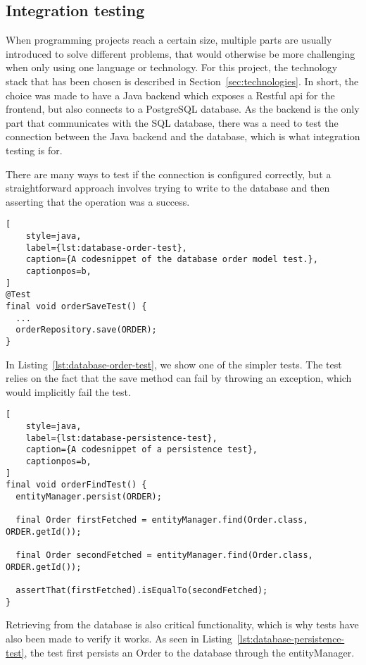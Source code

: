 \subsection{Integration testing}\label{subsec:integration-tests}

When programming projects reach a certain size, multiple parts are usually introduced to solve different problems,
that would otherwise be more challenging when only using one language or technology.
For this project, the technology stack that has been chosen is described in Section~\ref{sec:technologies}.
In short, the choice was made to have a Java backend which exposes a Restful api for the frontend, but also connects to
a PostgreSQL database.
As the backend is the only part that communicates with the SQL database, there was a need to test the connection between
the Java backend and the database, which is what integration testing is for.

There are many ways to test if the connection is configured correctly, but a straightforward approach involves trying
to write to the database and then asserting that the operation was a success.

\begin{lstlisting}[
    style=java,
    label={lst:database-order-test},
    caption={A codesnippet of the database order model test.},
    captionpos=b,
]
@Test
final void orderSaveTest() {
  ...
  orderRepository.save(ORDER);
}
\end{lstlisting}

In Listing~\ref{lst:database-order-test}, we show one of the simpler tests.
The test relies on the fact that the save method can fail by throwing an exception, which would implicitly fail the
test.

\begin{lstlisting}[
    style=java,
    label={lst:database-persistence-test},
    caption={A codesnippet of a persistence test},
    captionpos=b,
]
final void orderFindTest() {
  entityManager.persist(ORDER);

  final Order firstFetched = entityManager.find(Order.class, ORDER.getId());

  final Order secondFetched = entityManager.find(Order.class, ORDER.getId());

  assertThat(firstFetched).isEqualTo(secondFetched);
}
\end{lstlisting}

Retrieving from the database is also critical functionality, which is why tests have also been made to verify it works.
As seen in Listing~\ref{lst:database-persistence-test}, the test first persists an Order to the database through the
entityManager.
